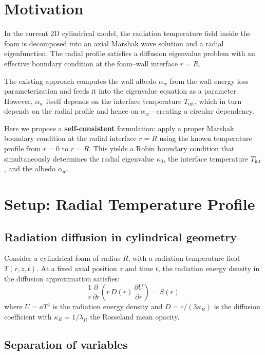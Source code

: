 \documentclass[12pt]{article}
\newcommand{\Tint}{T_{\mathrm{int}}}
\newcommand{\Rcm}{R}
\newcommand{\lR}{\lambda_R}
\newcommand{\alphaW}{\alpha_w}
\newcommand{\pder}[2]{\frac{\partial #1}{\partial #2}}
\begin{document}
\section{Motivation}

In the current 2D cylindrical model, the radiation temperature field inside the
foam is decomposed into an axial Marshak wave solution and a radial eigenfunction.
The radial profile satisfies a diffusion eigenvalue problem with an effective
boundary condition at the foam--wall interface $r = \Rcm$.

The existing approach computes the wall albedo $\alphaW$ from the wall energy
loss parameterization and feeds it into the eigenvalue equation as a parameter.
However, $\alphaW$ itself depends on the interface temperature $\Tint$, which
in turn depends on the radial profile and hence on $\alphaW$---creating a
circular dependency.

Here we propose a \textbf{self-consistent} formulation: apply a proper Marshak
boundary condition at the radial interface $r = \Rcm$ using the known
temperature profile from $r = 0$ to $r = \Rcm$. This yields a Robin boundary
condition that simultaneously determines the radial eigenvalue $\kappa_0$,
the interface temperature $\Tint$, and the albedo $\alphaW$.


\section{Setup: Radial Temperature Profile}

\subsection{Radiation diffusion in cylindrical geometry}

Consider a cylindrical foam of radius $\Rcm$, with a radiation temperature
field $T(r, z, t)$. At a fixed axial position $z$ and time $t$, the radiation
energy density in the diffusion approximation satisfies:
\begin{equation}
    \frac{1}{r}\pder{}{r}\left(r\, D(r)\,\pder{U}{r}\right) = S(r)
    \label{eq:radial_diffusion}
\end{equation}
where $U = a T^4$ is the radiation energy density and $D = c/(3\kappa_R)$ is
the diffusion coefficient with $\kappa_R = 1/\lR$ the Rosseland mean opacity.

\subsection{Separation of variables}
\end{document}
